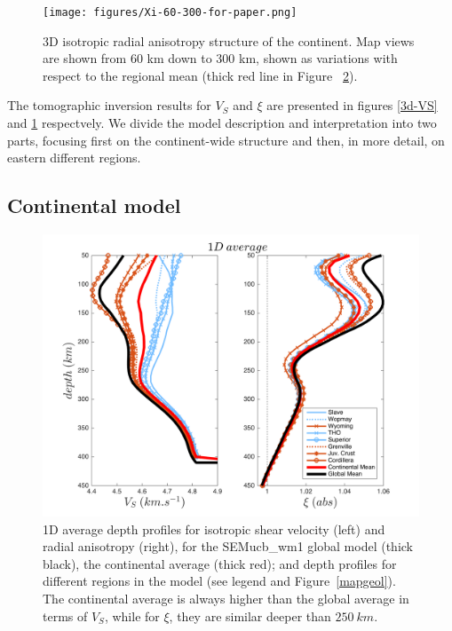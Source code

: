 \documentclass[12pt]{article}
\begin{document}
\begin{figure}[ht]
	\centering
	\texttt{[image: figures/Xi-60-300-for-paper.png]}

	\caption{\baselineskip 18pt
	3D isotropic radial anisotropy structure of the continent. Map views are shown from 60 km down to 300 km, shown as variations with respect to the regional mean (thick red line in Figure ~\ref{1daverage}). 
	}

	\label{3d-Xi}

\end{figure}


The tomographic inversion results for $V_S$ and $\xi$ are presented in figures \ref{3d-VS} and \ref{3d-Xi} respectvely. 
We divide the model description and interpretation into two parts, focusing first on the continent-wide structure and then, in more detail, on eastern different regions.

\subsection{Continental model}
\begin{figure}[ht]
	\centering
	\includegraphics[width=1\textwidth]{figures/1D_profile_with_regions.png}

	\caption{\baselineskip 18pt 
	1D average depth profiles for isotropic shear velocity (left) and radial anisotropy (right), for the SEMucb\_wm1 global model (thick black), the continental average (thick red); and depth profiles for different regions in the model (see legend and Figure~\ref{mapgeol}). The continental average is always higher than the global average in terms of $V_S$, while for $\xi$, they are similar deeper than $250 \: km$.}
	\label{1daverage}
\end{figure}
\end{document}
